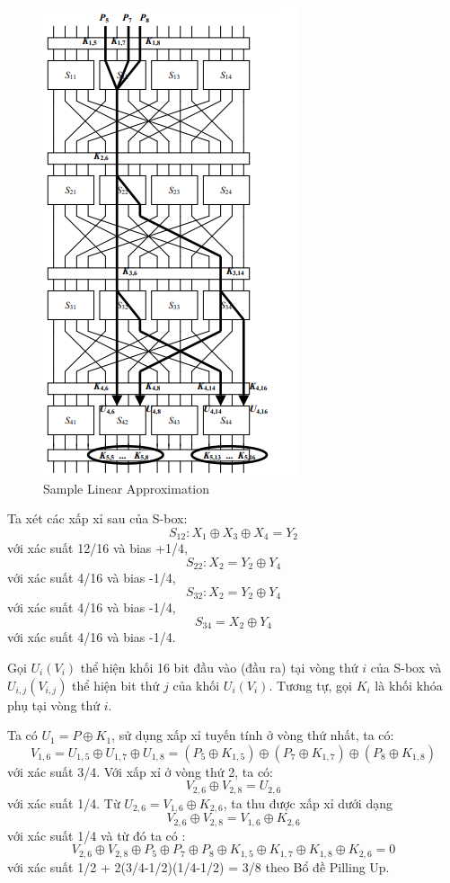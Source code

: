 \begin{figure}
    \centering
    \includegraphics[scale = 1.5]{Các công cụ và kĩ thuật sử dụng trong tấn công/sample linear app.png}
    
    \caption{Sample Linear Approximation}
    \end{figure}

Ta xét các xấp xỉ sau của S-box:
$$S_{12}: X_1 \oplus X_3 \oplus X_4 = Y_2$$ với xác suất 12/16 và bias +1/4,
$$ S_{22}: X_2 = Y_2 \oplus Y_4$$ với xác suất 4/16 và bias -1/4,
$$ S_{32}: X_2 = Y_2 \oplus Y_4$$ với xác suất 4/16 và bias -1/4, 
$$ S_{34} = X_2 \oplus Y_4$$ với xác suất 4/16 và bias -1/4.

Gọi $U_i(V_i)$ thể hiện khối 16 bit đầu vào (đầu ra) tại vòng thứ $i$ của S-box và $U_{i,j} (V_{i,j})$ thể hiện bit thứ $j$ của khối $U_i (V_i)$. Tương tự, gọi $K_i$ là khối khóa phụ tại vòng thứ $i$.

Ta có  $U_1 = P \oplus K_1$, sử dụng xấp xỉ tuyến tính ở vòng thứ nhất, ta có:
$$ V_{1,6} = U_{1,5} \oplus U_{1,7} \oplus U_{1,8} = (P_5 \oplus K_{1,5}) \oplus (P_7 \oplus K_{1,7}) \oplus (P_8 \oplus K_{1,8})$$
với xác suất 3/4. Với xấp xỉ ở vòng thứ 2, ta có:
$$ V_{2,6} \oplus V_{2,8} = U_{2,6}$$
với xác suất 1/4. Từ $U_{2,6} = V_{1,6} \oplus K_{2,6}$, ta thu được xấp xỉ dưới dạng 
$$ V_{2,6} \oplus V_{2,8} = V_{1,6} \oplus K_{2,6}$$ với xác suất 1/4 và từ đó ta có :
$$ V_{2,6} \oplus V_{2,8} \oplus P_5 \oplus P_7 \oplus P_8 \oplus K_{1,5} \oplus K_{1,7} \oplus K_{1,8} \oplus K_{2,6} = 0$$
với xác suất 1/2 + 2(3/4-1/2)(1/4-1/2) = 3/8 theo Bổ đề Pilling Up.

